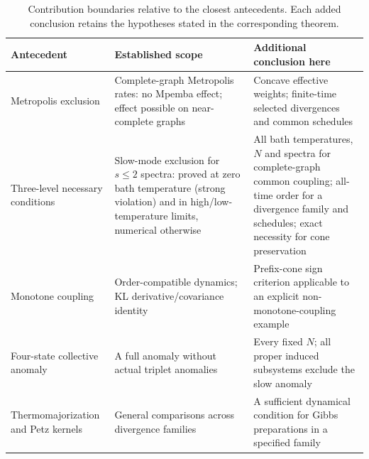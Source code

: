 \documentclass[11pt,a4paper]{article}
\theoremstyle{remark}\newtheorem{remark}[theorem]{Remark}
\begin{document}
\begin{table}[tb]
\centering\small
\caption{Contribution boundaries relative to the closest antecedents. Each added conclusion retains the hypotheses stated in the corresponding theorem.}
\label{tab:position}
\begin{tabular}{>{\raggedright\arraybackslash}p{.24\linewidth}>{\raggedright\arraybackslash}p{.33\linewidth}>{\raggedright\arraybackslash}p{.35\linewidth}}
\toprule Antecedent & Established scope & Additional conclusion here\\\midrule
Metropolis exclusion \cite{Klich2019} & Complete-graph Metropolis rates: no Mpemba effect; effect possible on near-complete graphs & Concave effective weights; finite-time selected divergences and common schedules\\[3pt]
Three-level necessary conditions \cite{Avitan2026} & Slow-mode exclusion for $s\le2$ spectra: proved at zero bath temperature (strong violation) and in high/low-temperature limits, numerical otherwise & All bath temperatures, $N$ and spectra for complete-graph common coupling; all-time order for a divergence family and schedules; exact necessity for cone preservation\\[3pt]
Monotone coupling \cite{Ohga2024} & Order-compatible dynamics; KL derivative/covariance identity & Prefix-cone sign criterion applicable to an explicit non-monotone-coupling example\\[3pt]
Four-state collective anomaly \cite{Gelbwaser2026} & A full anomaly without actual triplet anomalies & Every fixed $N$; all proper induced subsystems exclude the slow anomaly\\[3pt]
Thermomajorization and Petz kernels \cite{Vu2025,Salazar2026} & General comparisons across divergence families & A sufficient dynamical condition for Gibbs preparations in a specified family\\
\bottomrule
\end{tabular}
\end{table}
\end{document}
